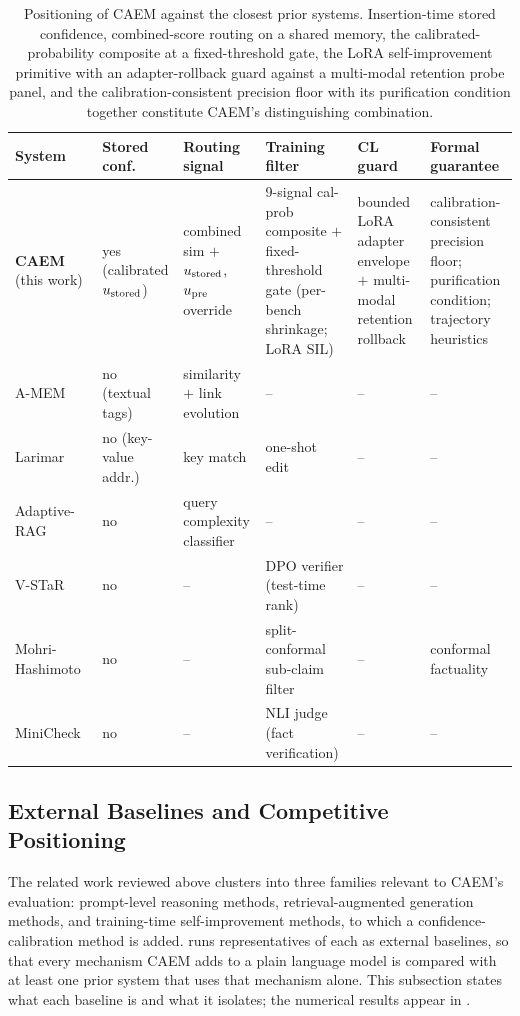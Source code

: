 \begin{table}[!htbp]
\centering
\footnotesize
\begin{tabular}{@{}p{2.4cm}p{1.7cm}p{2.6cm}p{2.5cm}p{2.0cm}p{2.0cm}@{}}
\toprule
\textbf{System} & \textbf{Stored conf.} & \textbf{Routing signal} & \textbf{Training filter} & \textbf{CL guard} & \textbf{Formal guarantee} \\
\midrule
\textbf{CAEM} (this work) & yes (calibrated $u_{\text{stored}}$) & combined sim $+$ $u_{\text{stored}}$, $u_{\text{pre}}$ override & 9-signal cal-prob composite $+$ fixed-threshold gate (per-bench shrinkage; LoRA SIL) & bounded LoRA adapter envelope $+$ multi-modal retention rollback & calibration-consistent precision floor; purification condition; trajectory heuristics \\
A-MEM~\cite{xu2025amem} & no (textual tags) & similarity $+$ link evolution & -- & -- & -- \\
Larimar~\cite{larimar2024das} & no (key-value addr.) & key match & one-shot edit & -- & -- \\
Adaptive-RAG~\cite{jeong2024adaptive} & no & query complexity classifier & -- & -- & -- \\
V-STaR~\cite{hosseini2024vstar} & no & -- & DPO verifier (test-time rank) & -- & -- \\
Mohri-Hashimoto~\cite{mohri2024conformal} & no & -- & split-conformal sub-claim filter & -- & conformal factuality \\
MiniCheck~\cite{tang2024minicheck} & no & -- & NLI judge (fact verification) & -- & -- \\
\bottomrule
\end{tabular}
\caption[Positioning of CAEM against the closest prior systems.]{Positioning of CAEM against the closest prior systems. Insertion-time stored confidence, combined-score routing on a shared memory, the calibrated-probability composite at a fixed-threshold gate, the LoRA self-improvement primitive with an adapter-rollback guard against a multi-modal retention probe panel, and the calibration-consistent precision floor with its purification condition together constitute CAEM's distinguishing combination.}
\label{tab:positioning}
\end{table}

\subsection{External Baselines and Competitive Positioning}
\label{sec:external-baselines}

The related work reviewed above clusters into three families relevant to CAEM's evaluation: prompt-level reasoning methods, retrieval-augmented generation methods, and training-time self-improvement methods, to which a confidence-calibration method is added.  runs representatives of each as external baselines, so that every mechanism CAEM adds to a plain language model is compared with at least one prior system that uses that mechanism alone. This subsection states what each baseline is and what it isolates; the numerical results appear in .

